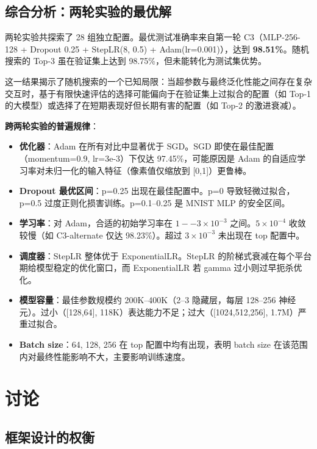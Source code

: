 \documentclass[12pt,a4paper]{ctexart}
\begin{document}
\subsection{综合分析：两轮实验的最优解}

两轮实验共探索了 28 组独立配置。最优测试准确率来自第一轮 C3（MLP-256-128 + Dropout 0.25 + StepLR(8, 0.5) + Adam(lr=0.001)），达到 \textbf{98.51\%}。随机搜索的 Top-3 虽在验证集上达到 98.75\%，但未能转化为测试集优势。

这一结果揭示了随机搜索的一个已知局限：当超参数与最终泛化性能之间存在复杂交互时，基于有限快速评估的选择可能偏向于在验证集上过拟合的配置（如 Top-1 的大模型）或选择了在短期表现好但长期有害的配置（如 Top-2 的激进衰减）。

\textbf{跨两轮实验的普遍规律}：

\begin{itemize}
    \item \textbf{优化器}：Adam 在所有对比中显著优于 SGD。SGD 即使在最佳配置（momentum=0.9, lr=3e-3）下仅达 97.45\%，可能原因是 Adam 的自适应学习率对未归一化的输入特征（像素值仅缩放到 [0,1]）更鲁棒。
    \item \textbf{Dropout 最优区间}：p=0.25 出现在最佳配置中。p=0 导致轻微过拟合，p=0.5 过度正则化损害训练。p=0.1--0.25 是 MNIST MLP 的安全区间。
    \item \textbf{学习率}：对 Adam，合适的初始学习率在 $1--3 \times 10^{-3}$ 之间。$5 \times 10^{-4}$ 收敛较慢（如 C3-alternate 仅达 98.23\%）。超过 $3 \times 10^{-3}$ 未出现在 top 配置中。
    \item \textbf{调度器}：StepLR 整体优于 ExponentialLR。StepLR 的阶梯式衰减在每个平台期给模型稳定的优化窗口，而 ExponentialLR 若 gamma 过小则过早扼杀优化。
    \item \textbf{模型容量}：最佳参数规模约 200K--400K（2--3 隐藏层，每层 128--256 神经元）。过小（[128,64], 118K）表达能力不足；过大（[1024,512,256], 1.7M）严重过拟合。
    \item \textbf{Batch size}：64, 128, 256 在 top 配置中均有出现，表明 batch size 在该范围内对最终性能影响不大，主要影响训练速度。
\end{itemize}

\section{讨论}

\subsection{框架设计的权衡}
\end{document}
